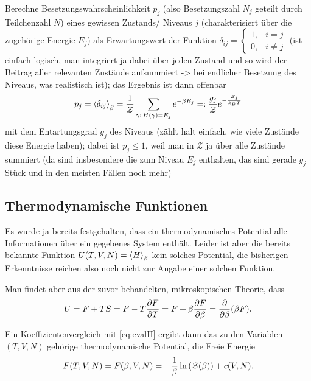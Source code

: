 Berechne Besetzungswahrscheinlichkeit $p_j$ (also Besetzungszahl $N_j$ geteilt durch Teilchenzahl $N$) eines gewissen Zustands/ Niveaus $j$ (charakterisiert über die zugehörige Energie $E_j$) als Erwartungswert der Funktion $\delta_{ij} = \begin{cases} 1, & i = j \\ 0, & i \neq j \end{cases}$ (ist einfach logisch, man integriert ja dabei über jeden Zustand und so wird der Beitrag aller relevanten Zustände aufsummiert -> bei endlicher Besetzung des Niveaus, was realistisch ist); das Ergebnis ist dann offenbar
\begin{equation}
p_j = \expval{\delta_{ij}}_\beta = \frac{1}{\mathcal{Z}} \sum_{\gamma: \, H(\gamma) = E_j} e^{-\beta E_j} =: \frac{g_j}{\mathcal{Z}} e^{-\frac{E_j}{k_B T}}
\end{equation}
mit dem Entartungsgrad $g_j$ des Niveaus (zählt halt einfach, wie viele Zustände diese Energie haben); dabei ist $p_j \leq 1$, weil man in $\mathcal{Z}$ ja über alle Zustände summiert (da sind insbesondere die zum Niveau $E_j$ enthalten, das sind gerade $g_j$ Stück und in den meisten Fällen noch mehr)




	\subsection{Thermodynamische Funktionen}
Es wurde ja bereits festgehalten, dass ein thermodynamisches Potential alle Informationen über ein gegebenes System enthält. Leider ist aber die bereits bekannte Funktion $U(T,V,N) = \expval{H}_\beta$ kein solches Potential, die bisherigen Erkenntnisse reichen also noch nicht zur Angabe einer solchen Funktion.

Man findet aber aus der zuvor behandelten, mikroskopischen Theorie, dass
\begin{equation}\label{key}
U = F + T S = F - T \pdv{F}{T} = F + \beta \pdv{F}{\beta} = \pdv{\beta}(\beta F) .
\end{equation}

Ein Koeffizientenvergleich mit \eqref{eq:evalH} ergibt dann das zu den Variablen $(T,V,N)$ gehörige thermodynamische Potential, die Freie Energie
\begin{equation}\label{key}
F(T,V,N) = F(\beta, V, N) = -\frac{1}{\beta} \ln\qty(\mathcal{Z}(\beta)) + c(V, N) .
\end{equation}


